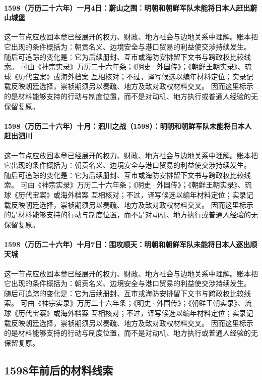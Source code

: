 \paragraph{1598（万历二十六年）一月4日：蔚山之围：明朝和朝鲜军队未能将日本人赶出蔚山城堡} 这一节点应放回本章已经展开的权力、财政、地方社会与边地关系中理解。账本把它出现的条件概括为：朝贡名义、边境安全与港口贸易的利益使交涉持续发生。 随后可追踪的变化是：它为后续册封、互市或海防安排留下文书与跨政权比较线索。 可由《神宗实录》万历二十六年条；《明史·外国传》；《朝鲜王朝实录》、琉球《历代宝案》或海外档案 互相核对；不过，译写候选以编年材料定位；实录记载反映朝廷选择，崇祯期须另以奏疏、地方及敌对政权材料交叉。 因而这里标示的是材料能够支持的行动与制度位置，而不是对动机、地方执行或普通人经验的无保留复原。

\paragraph{1598（万历二十六年）十月：泗川之战（1598）：明朝和朝鲜军队未能将日本人赶出泗川} 这一节点应放回本章已经展开的权力、财政、地方社会与边地关系中理解。账本把它出现的条件概括为：朝贡名义、边境安全与港口贸易的利益使交涉持续发生。 随后可追踪的变化是：它为后续册封、互市或海防安排留下文书与跨政权比较线索。 可由《神宗实录》万历二十六年条；《明史·外国传》；《朝鲜王朝实录》、琉球《历代宝案》或海外档案 互相核对；不过，译写候选以编年材料定位；实录记载反映朝廷选择，崇祯期须另以奏疏、地方及敌对政权材料交叉。 因而这里标示的是材料能够支持的行动与制度位置，而不是对动机、地方执行或普通人经验的无保留复原。

\paragraph{1598（万历二十六年）十月7日：围攻顺天：明朝和朝鲜军队未能将日本人逐出顺天城} 这一节点应放回本章已经展开的权力、财政、地方社会与边地关系中理解。账本把它出现的条件概括为：朝贡名义、边境安全与港口贸易的利益使交涉持续发生。 随后可追踪的变化是：它为后续册封、互市或海防安排留下文书与跨政权比较线索。 可由《神宗实录》万历二十六年条；《明史·外国传》；《朝鲜王朝实录》、琉球《历代宝案》或海外档案 互相核对；不过，译写候选以编年材料定位；实录记载反映朝廷选择，崇祯期须另以奏疏、地方及敌对政权材料交叉。 因而这里标示的是材料能够支持的行动与制度位置，而不是对动机、地方执行或普通人经验的无保留复原。

\subsection{1598年前后的材料线索}

